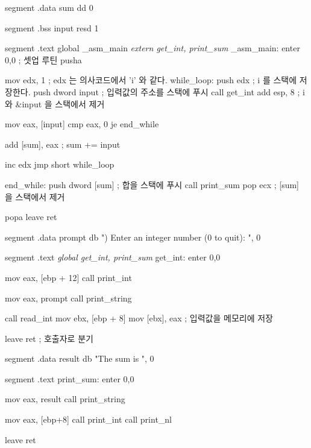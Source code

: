 \begin{AsmCodeListing}[label=main4.asm,commandchars=\\\{\}]

segment .data
sum     dd   0

segment .bss
input   resd 1

segment .text
        global  _asm_main
\textit{        extern  get_int, print_sum}
_asm_main:
        enter   0,0               ; 셋업 루틴
        pusha

        mov     edx, 1            ; edx 는 의사코드에서 'i' 와 같다. 
while_loop:
        push    edx               ; i 를 스택에 저장한다. 
        push    dword input       ; 입력값의 주소를 스택에 푸시 
        call    get_int
        add     esp, 8            ; i 와 &input 을 스택에서 제거 

        mov     eax, [input]
        cmp     eax, 0
        je      end_while

        add     [sum], eax        ; sum += input

        inc     edx
        jmp     short while_loop

end_while:
        push    dword [sum]       ; 합을 스택에 푸시 
        call    print_sum
        pop     ecx               ; [sum] 을 스택에서 제거 

        popa
        leave                     
        ret
\end{AsmCodeListing}

\begin{AsmCodeListing}[label=sub4.asm,commandchars=\\\{\}]

segment .data
prompt  db      ") Enter an integer number (0 to quit): ", 0

segment .text
\textit{        global  get_int, print_sum}
get_int:
        enter   0,0

        mov     eax, [ebp + 12]
        call    print_int

        mov     eax, prompt
        call    print_string
        
        call    read_int
        mov     ebx, [ebp + 8]
        mov     [ebx], eax         ; 입력값을 메모리에 저장

        leave
        ret                        ; 호출자로 분기

segment .data
result  db      "The sum is ", 0

segment .text
print_sum:
        enter   0,0

        mov     eax, result
        call    print_string

        mov     eax, [ebp+8]
        call    print_int
        call    print_nl

        leave
        ret
\end{AsmCodeListing}

